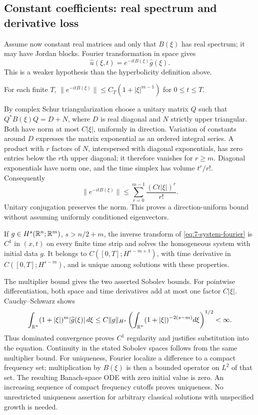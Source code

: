 \Needspace{55mm}
\subsection{Constant coefficients: real spectrum and derivative loss}
Assume now constant real matrices and only that $B(\xi)$ has real
spectrum; it may have Jordan blocks. Fourier transformation in space gives
\begin{equation}\label{eq:7-system-fourier}
 \widehat u(\xi,t)=e^{-itB(\xi)}\widehat g(\xi).
\end{equation}
This is a weaker hypothesis than the hyperbolicity definition above.
\begin{lemma}
For each finite $T$, $\|e^{-itB(\xi)}\|\leq C_T(1+|\xi|^{m-1})$ for
$0\leq t\leq T$.
\end{lemma}
\begin{expandedproof}
By complex Schur triangularization choose a unitary matrix $Q$ such that
$Q^*B(\xi)Q=D+N$, where $D$ is real diagonal and $N$ strictly upper
triangular. Both have norm at most $C|\xi|$, uniformly in direction.
Variation of constants around $D$ expresses the matrix exponential as an
ordered integral series. A product with $r$ factors of $N$, interspersed
with diagonal exponentials, has zero entries below the $r$th upper
diagonal; it therefore vanishes for $r\geq m$.
Diagonal exponentials have norm one, and the time simplex has volume
$t^r/r!$. Consequently
\[
 \|e^{-itB(\xi)}\|\leq\sum_{r=0}^{m-1}\frac{(C t|\xi|)^r}{r!}.
\]
Unitary conjugation preserves the norm. This proves a direction-uniform
bound without assuming uniformly conditioned eigenvectors.
\end{expandedproof}
\Needspace{55mm}
\begin{theorem}
If $g\in H^s(\mathbb{R}^n;\mathbb{R}^m)$, $s>n/2+m$, the inverse transform of
\eqref{eq:7-system-fourier} is $C^1$ in $(x,t)$ on every finite time strip
and solves the homogeneous system with initial data $g$.
It belongs to $C([0,T];H^{s-m+1})$, with time derivative in
$C([0,T];H^{s-m})$, and is unique among solutions with these properties.
\end{theorem}
\begin{expandedproof}
The multiplier bound gives the two asserted Sobolev bounds.
For pointwise differentiation, both space and time derivatives add at most
one factor $C|\xi|$. Cauchy--Schwarz shows
\[
 \int_{\mathbb{R}^n}(1+|\xi|)^m|\widehat g(\xi)|\,d\xi
 \leq C\|g\|_{H^s}
 \left(\int_{\mathbb{R}^n}(1+|\xi|)^{-2(s-m)}d\xi\right)^{1/2}<\infty.
\]
Thus dominated convergence proves $C^1$ regularity and justifies
substitution into the equation. Continuity in the stated Sobolev spaces
follows from the same multiplier bound. For uniqueness, Fourier localize
a difference to a compact frequency set; multiplication by $B(\xi)$
is then a bounded operator on $L^2$ of that set. The resulting Banach-space
ODE with zero initial value is zero. An increasing sequence of compact
frequency cutoffs proves uniqueness. No unrestricted uniqueness assertion
for arbitrary classical solutions with unspecified growth is needed.
\end{expandedproof}
